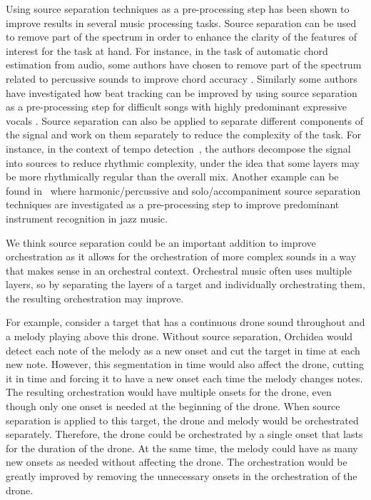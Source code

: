 \documentclass{article}
\begin{document}
  Using source separation techniques as a pre-processing step has been shown to improve results in several music processing tasks. Source separation can be used to remove part of the spectrum in order to enhance the clarity of the features of interest for the task at hand. For instance, in the task of automatic chord estimation from audio, some authors have chosen to remove part of the spectrum related to percussive sounds to improve chord accuracy \cite{Reed_al2009}. Similarly some authors have investigated how beat tracking can be improved by using source separation as a pre-processing step for difficult songs with highly predominant expressive vocals \cite{ZapGom2012}. Source separation can also be applied to separate different components of the signal and work on them separately to reduce the complexity of the task. For instance, in the context of tempo detection~\cite{ChoRae2009}, the authors decompose the signal into sources to reduce rhythmic complexity, under the idea that some layers may be more rhythmically regular than the overall mix. Another example can be found in~\cite{GomAbecan2018} where harmonic/percussive and solo/accompaniment source separation techniques are investigated as a pre-processing step to improve predominant instrument recognition in jazz music.
    
  We think source separation could be an important addition to improve orchestration as it allows for the orchestration of more complex sounds in a way that makes sense in an orchestral context. Orchestral music often uses multiple layers, so by separating the layers of a target and individually orchestrating them, the resulting orchestration may improve. 
    
  For example, consider a target that has a continuous drone sound throughout and a melody playing above this drone. Without source separation, Orchidea would detect each note of the melody as a new onset and cut the target in time at each new note. However, this segmentation in time would also affect the drone, cutting it in time and forcing it to have a new onset each time the melody changes notes. The resulting orchestration would have multiple onsets for the drone, even though only one onset is needed at the beginning of the drone. When source separation is applied to this target, the drone and melody would be orchestrated separately. Therefore, the drone could be orchestrated by a single onset that lasts for the duration of the drone. At the same time, the melody could have as many new onsets as needed without affecting the drone. The orchestration would be greatly improved by removing the unnecessary onsets in the orchestration of the drone.
    
\end{document}
